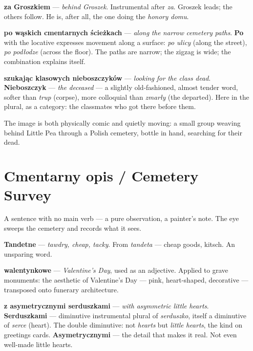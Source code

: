 \textbf{za Groszkiem} --- \textit{behind Groszek}. Instrumental after
\textit{za}. Groszek leads; the others follow. He is, after all, the
one doing the \textit{honory domu}.

\textbf{po wąskich cmentarnych ścieżkach} --- \textit{along the narrow
cemetery paths}. \textbf{Po} with the locative expresses movement
along a surface: \textit{po ulicy} (along the street), \textit{po
podłodze} (across the floor). The paths are narrow; the zigzag is
wide; the combination explains itself.

\textbf{szukając klasowych nieboszczyków} --- \textit{looking for the
class dead}. \textbf{Nieboszczyk} --- \textit{the deceased} --- a
slightly old-fashioned, almost tender word, softer than \textit{trup}
(corpse), more colloquial than \textit{zmarły} (the departed). Here
in the plural, as a category: the classmates who got there before them.

The image is both physically comic and quietly moving: a small group
weaving behind Little Pea through a Polish cemetery, bottle in hand,
searching for their dead.

\section{Cmentarny opis / Cemetery Survey}


A sentence with no main verb --- a pure observation, a painter's note.
The eye sweeps the cemetery and records what it sees.

\textbf{Tandetne} --- \textit{tawdry, cheap, tacky}. From
\textit{tandeta} --- cheap goods, kitsch. An unsparing word.

\textbf{walentynkowe} --- \textit{Valentine's Day}, used as an
adjective. Applied to grave monuments: the aesthetic of Valentine's
Day --- pink, heart-shaped, decorative --- transposed onto funerary
architecture.

\textbf{z asymetrycznymi serduszkami} --- \textit{with asymmetric
little hearts}. \textbf{Serduszkami} --- diminutive instrumental plural
of \textit{serduszko}, itself a diminutive of \textit{serce} (heart).
The double diminutive: not \textit{hearts} but \textit{little hearts},
the kind on greetings cards. \textbf{Asymetrycznymi} --- the detail
that makes it real. Not even well-made little hearts.

